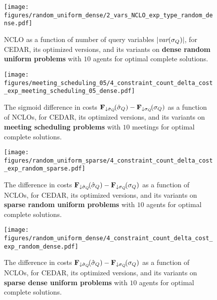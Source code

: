 \documentclass[twoside,11pt]{article}
\begin{document}
\begin{figure}[h]
\centering
\small
\texttt{[image: figures/random\_uniform\_dense/2\_vars\_NCLO\_exp\_type\_random\_dense.pdf]} \\ 
\vspace{-0.5em} 
\caption{NCLO as a function of number of query variables $|{\textit{var}(\sigma_Q)}|$, for CEDAR, its optimized versions, and its variants on \textbf{dense random uniform problems} with $10$ agents for optimal complete solutions.}

\label{fig:2_NCLO_Q_dense}
\end{figure}



\begin{figure}[h]
\centering
\small
\texttt{[image: figures/meeting\_scheduling\_05/4\_constraint\_count\_delta\_cost\_exp\_meeting\_scheduling\_05\_dense.pdf]} \\ 
\vspace{-0.5em} 
\caption{The sigmoid difference in costs ${\bf{F}}_{\downarrow \hat{\sigma}_Q}\!(\hat{\sigma}_Q) - {\bf{F}}_{\downarrow \sigma_Q}\!(\sigma_Q)$ as a function of NCLOs, for CEDAR, its optimized versions, and its variants on \textbf{meeting scheduling problems} with $10$ meetings for optimal complete solutions.}
\label{fig:4_NCLO_Q_meeting}
\end{figure}

\begin{figure}[h]
\centering
\small
\texttt{[image: figures/random\_uniform\_sparse/4\_constraint\_count\_delta\_cost\_exp\_random\_sparse.pdf]} \\ 
\vspace{-0.5em} 
\caption{The difference in costs ${\bf{F}}_{\downarrow \hat{\sigma}_Q}\!(\hat{\sigma}_Q) - {\bf{F}}_{\downarrow \sigma_Q}\!(\sigma_Q)$ as a function of NCLOs, for CEDAR, its optimized versions, and its variants on \textbf{sparse random uniform problems} with $10$ agents for optimal complete solutions.}


\label{fig:4_NCLO_sparse}
\end{figure}

\begin{figure}[h]
\centering
\small
\texttt{[image: figures/random\_uniform\_dense/4\_constraint\_count\_delta\_cost\_exp\_random\_dense.pdf]} \\ 
\vspace{-0.5em} 
\caption{The difference in costs ${\bf{F}}_{\downarrow \hat{\sigma}_Q}\!(\hat{\sigma}_Q) - {\bf{F}}_{\downarrow \sigma_Q}\!(\sigma_Q)$ as a function of NCLOs, for CEDAR, its optimized versions, and its variants on \textbf{sparse dense uniform problems} with $10$ agents for optimal complete solutions.}
\label{fig:4_NCLO_Q_dense}
\end{figure}
\end{document}
